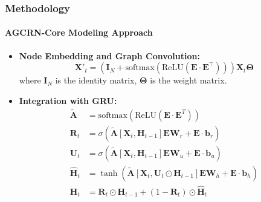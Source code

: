 \documentclass[light]{lutbeamer} %
\begin{document}
\begin{frame}
    \frametitle{Methodology}
    \framesubtitle{AGCRN-Core Modeling Approach}
    \begin{itemize}
        \item \textbf{Node Embedding and Graph Convolution:}
              \[
                  \bm{X}'_t = \left(\bm{I}_N + \text{softmax}\left(\text{ReLU}\left(\bm{E} \cdot \bm{E}^\top\right)\right)\right) \bm{X}_t \bm{\Theta}
              \]
              where \(\bm{I}_N\) is the identity matrix, \(\bm{\Theta}\) is the weight matrix.
        \item \textbf{Integration with GRU:}
              \begin{equation*}
                  \begin{split}
                      \tilde{\bm A} &= \text{softmax}(\text{ReLU}(\bm E\cdot \bm E^T)) \\
                      {\bm R_t} &= \sigma\left(\tilde{\bm A}[\bm X_t, \bm H_{t-1}]\bm E\bm W_r + \bm E\cdot\bm b_r \right)
                      \\
                      {\bm U_t} &= \sigma\left(\tilde{\bm A}[\bm X_t, \bm H_{t-1}]\bm E\bm W_u + \bm E\cdot\bm b_u \right)
                      \\
                      \hat{\bm H}_t &= \tanh\left(\tilde{\bm A}[\bm X_t, \bm U_t\odot\bm H_{t-1}]\bm E\bm W_h + \bm E\cdot\bm b_h \right)
                      \\
                      \bm H_t &= \bm R_t\odot \bm H_{t-1} + (1-\bm R_t)\odot \hat{\bm H}_t
                  \end{split}
              \end{equation*}
    \end{itemize}
\end{frame}
\end{document}
